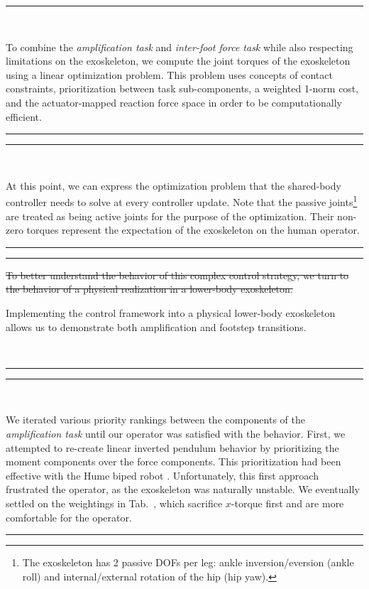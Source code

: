 \documentclass[10pt,letterpaper]{letter}
\renewcommand*{\ref}[1]{\zref{#1}}
\newcommand*{\ta}[1]{\textcolor[HTML]{107f10}{#1}}
\newcommand*{\ra}[1]{}
\newcommand{\example}[1]{

\rule{\textwidth}{1.5pt}
\begin{minipage}{.45\textwidth}%
\renewcommand*{\ra}[1]{\textcolor[HTML]{606060}{\sout{##1}}}%
\renewcommand*{\ta}[1]{}%
#1%
\end{minipage}\hspace{.099\textwidth}\begin{minipage}{.45\textwidth}#1\end{minipage}\\
\rule{\textwidth}{1.5pt}
}
\newcommand{\paperquote}[1]{%
	\begin{center}
		
		\begin{minipage}{.8\textwidth}
			{\rule{\textwidth}{.5pt}}\vspace{.5em}\\
			\begin{minipage}{\textwidth}\setlength{\parindent}{2em}#1\end{minipage}
			\vspace{.5em}
			{\rule{\textwidth}{.5pt}}
		\end{minipage}%
	\end{center}
}
\begin{document}
\begin{letter}{}
\paperquote{
\ta{To combine the \emph{amplification task} and \emph{inter-foot force task} while also respecting limitations on the exoskeleton, we compute the joint torques of the exoskeleton using a linear optimization problem. This problem uses concepts of contact constraints, prioritization between task sub-components, a weighted 1-norm cost, and the actuator-mapped reaction force space in order to be computationally efficient.}
}

\paperquote{
\ta{At this point, we can express the optimization problem that the shared-body controller needs to solve at every controller update.}
\ta{Note that the passive joints\footnote{\ta{The exoskeleton has 2 passive DOFs per leg: ankle inversion/eversion (ankle roll) and internal/external rotation of the hip (hip yaw).}} are treated as being active joints for the purpose of the optimization. Their non-zero torques represent the expectation of the exoskeleton on the human operator.}
}

\example{
\ra{To better understand the behavior of this complex control strategy, we turn to the behavior of a physical realization in a lower-body exoskeleton.}\ta{Implementing the control framework into a physical lower-body exoskeleton allows us to demonstrate both amplification and footstep transitions.}
}

\paperquote{
\ra{One might suspect that the order of task importance would be easy to determine a priori, but it was a rather empirical weighting process in practice.}%
\ta{We iterated various priority rankings between the components of the \emph{amplification task} until our operator was satisfied with the behavior.}
\ra{First, seeking to fall back to the linear inverted pendulum behaviors of a point foot robot (that is, prioritizing amplification in the direction between the center of mass and the center of pressure as well as amplification in hip pitch---similar to the hip tasks of the Hume biped \cite{KimEA2016TRO}) we found them to frustrate the operator with their naturally unstable lateral position.}%
\ta{First, we attempted to re-create linear inverted pendulum behavior by prioritizing the moment components over the force components. This prioritization had been effective with the Hume biped robot \cite{KimEA2016TRO}. Unfortunately, this first approach frustrated the operator, as the exoskeleton was naturally unstable.}
\ta{We eventually settled on the weightings in Tab.~\ref{tab:priorities}, which sacrifice $x$-torque first and are more comfortable for the operator.}
}


\end{letter}
\end{document}
